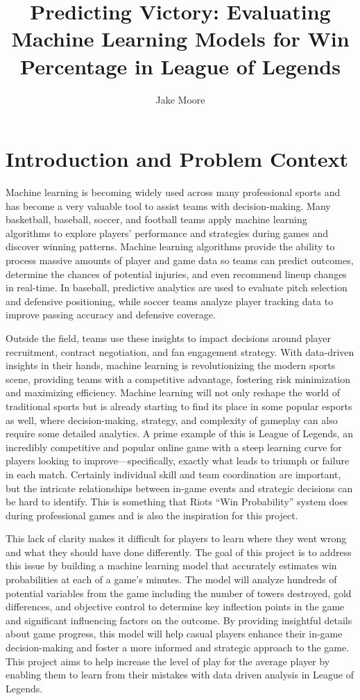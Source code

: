 \documentclass[10pt,twocolumn]{article}
\title{Predicting Victory: Evaluating Machine Learning Models for Win Percentage in League of Legends}
\author{Jake Moore}
\affiliation{Occidental College}
\begin{document}
\maketitle

\section{Introduction and Problem Context}


Machine learning is becoming widely used across many professional sports and has become a very valuable tool to assist teams with decision-making. Many basketball, baseball, soccer, and football teams apply machine learning algorithms to explore players’ performance and strategies during games and discover winning patterns. Machine learning algorithms provide the ability to process massive amounts of player and game data so teams can predict outcomes, determine the chances of potential injuries, and even recommend lineup changes in real-time. In baseball, predictive analytics are used to evaluate pitch selection and defensive positioning, while soccer teams analyze player tracking data to improve passing accuracy and defensive coverage.

Outside the field, teams use these insights to impact decisions around player recruitment, contract negotiation, and fan engagement strategy. With data-driven insights in their hands, machine learning is revolutionizing the modern sports scene, providing teams with a competitive advantage, fostering risk minimization and maximizing efficiency. Machine learning will not only reshape the world of traditional sports but is already starting to find its place in some popular esports as well, where decision-making, strategy, and complexity of gameplay can also require some detailed analytics. A prime example of this is League of Legends, an incredibly competitive and popular online game with a steep learning curve for players looking to improve—specifically, exactly what leads to triumph or failure in each match. Certainly individual skill and team coordination are important, but the intricate relationships between in-game events and strategic decisions can be hard to identify. This is something that Riots “Win Probability” \cite{Xu2023}system does during professional games and is also the inspiration for this project. 

This lack of clarity makes it difficult for players to learn where they went wrong and what they should have done differently. The goal of this project is to address this issue by building a machine learning model that accurately estimates win probabilities at each of a game’s minutes. The model will analyze hundreds of potential variables from the game including the number of towers destroyed, gold differences, and objective control to determine key inflection points in the game and significant influencing factors on the outcome. By providing insightful details about game progress, this model will help casual players enhance their in-game decision-making and foster a more informed and strategic approach to the game. This project aims to help increase the level of play for the average player by enabling them to learn from their mistakes with data driven analysis in League of Legends.
\end{document}
